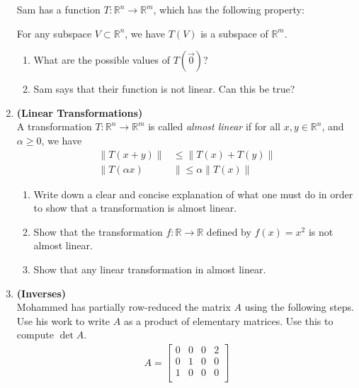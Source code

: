 \documentclass[red]{tutorial}
\newcommand{\R}{\mathbb{R}}
\theoremstyle{definition}
\theoremstyle{theorem}
\begin{document}
\begin{tutorial}
\begin{enumerate}
{      Sam has a function $T\colon\R^n\to \R^m$, which has the following
      property:
      \begin{center}
        For any subspace $V\subset \R^n$, we have $T(V)$ is a subspace of $\R^m$.
      \end{center}
      \begin{enumerate}
        \item What are the possible values of $T(\vec0)$?
        \item Sam says that their function is not linear. Can this be true?
      \end{enumerate}
      }
    \item \textbf{(Linear Transformations)}\\
      A transformation $T:\R^n\to \R^m$ is called 
      \textit{almost linear} if for all $x,y\in \R^n$, and 
      $\alpha\ge 0$, we have 
      \begin{align*}
        \|T(x+y)\| &\le \|T(x)+T(y)\|\\
        \|T(\alpha x)&\|\le \alpha \|T(x)\|
      \end{align*}
      \begin{enumerate}
        \item Write down a clear and concise explanation of what 
          one must do in order to show that a transformation is 
          almost linear.
        \item Show that the transformation $f:\R\to\R$ defined 
          by $f(x) = x^2$ is not almost linear.
        \item Show that any linear transformation in almost linear.
      \end{enumerate}
    \item \textbf{(Inverses)}\\
      \newcommand{\pmin}{\phantom{-}}
      \newcommand{\row}[1]{\mathrm{r}_{#1}}
      Mohammed has partially row-reduced the matrix $A$ using the
      following steps. Use his work to write $A$ as a product of elementary
      matrices. Use this to compute $\det A$.
      \begin{align*}
        A = \begin{bmatrix}
          0 & 0 & 0 & 2 \\
          0 & 1 & 0 & 0 \\
          1 & 0 & 0 & 0 \\

\end{bmatrix}
\end{align*}
\end{enumerate}
\end{tutorial}
\end{document}
